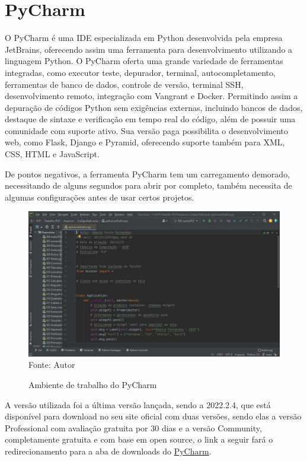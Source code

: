     \section{PyCharm}
    O PyCharm é uma IDE especializada em Python desenvolvida pela empresa JetBrains, oferecendo assim uma ferramenta para desenvolvimento utilizando a linguagem Python. 
    O PyCharm oferta uma grande variedade de ferramentas integradas, como executor teste, depurador, terminal, autocompletamento, ferramentas de banco de dados, controle de versão, terminal SSH, desenvolvimento remoto, integração com Vangrant e Docker.
    Permitindo assim a depuração de códigos Python sem exigências externas, incluindo bancos de dados, destaque de sintaxe e verificação em tempo real do código, além de possuir uma comunidade com suporte ativo. Sua versão paga possibilita o desenvolvimento web, como Flask, Django e Pyramid, oferecendo suporte também para XML, CSS, HTML e JavaScript.
    
    De pontos negativos, a ferramenta PyCharm tem um carregamento demorado, necessitando de alguns segundos para abrir por completo, também necessita de algumas configurações antes de usar certos projetos.
    
    
    \begin{figure}[H]
    	\begin{center}
    		\caption{Ambiente de trabalho do PyCharm} \label{ling1}
    		\includegraphics[width=15cm]{pycharm.JPG} \\
    		{\tiny \sf Fonte:{ Autor}}
    	\end{center}
    \end{figure}
    
     A versão utilizada foi a última versão lançada, sendo a 2022.2.4, que está disponível para download no seu site oficial com duas versões, sendo elas a versão Professional com avaliação gratuita por 30 dias e a versão Community, completamente gratuita e com base em open source, o link a seguir fará o redirecionamento para a aba de downloads do \href{https://www.jetbrains.com/pt-br/pycharm/download/#section=windows}{PyCharm}.
    
